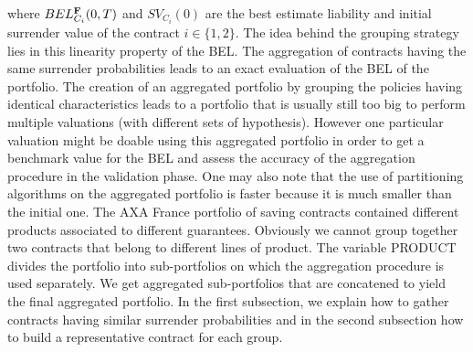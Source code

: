 where $BEL_{C_{i}}^{\bold{F}}(0,T)$ and $SV_{C_{i}}(0)$ are the best estimate liability and initial surrender value of the contract $i\in\{1,2\}$. The idea behind the grouping strategy lies in this linearity property of the BEL. The aggregation of contracts having the same surrender probabilities leads to an exact evaluation of the BEL of the portfolio. The creation of an aggregated portfolio by grouping the policies having identical characteristics leads to a portfolio that is usually still too big to perform multiple valuations (with different sets of hypothesis). However one particular valuation might be doable using this aggregated portfolio in order to get a benchmark value for the BEL and assess the accuracy of the aggregation procedure in the validation phase. One may also note that the use of partitioning algorithms on the aggregated portfolio is faster because it is much smaller than the initial one. The AXA France portfolio of saving contracts contained different products associated to different guarantees. Obviously we cannot group together two contracts that belong to different lines of product. The variable PRODUCT divides the portfolio into sub-portfolios on which the aggregation procedure is used separately. We get aggregated sub-portfolios that are concatened to yield the final aggregated portfolio. In the first subsection, we explain how to gather contracts having similar surrender probabilities and in the second subsection how to build a representative contract for each group.  
